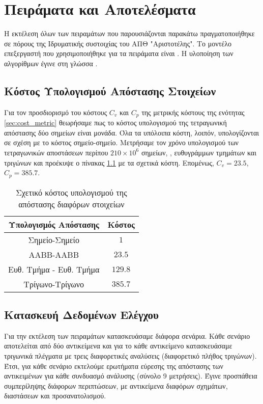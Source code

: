 \chapter{Πειράματα και Αποτελέσματα}
\label{ch:experiments}
Η εκτέλεση όλων των πειραμάτων που παρουσιάζονται παρακάτω 
πραγματοποιήθηκε σε πόρους της Ιδρυματικής συστοιχίας του 
ΑΠΘ "Αριστοτέλης".
Το μοντέλο επεξεργαστή που χρησιμοποιήθηκε για τα πειράματα 
είναι .
Η υλοποίηση των αλγορίθμων έγινε στη γλώσσα . 


\section{Κόστος Υπολογισμού Απόστασης Στοιχείων}
\label{sec:geom_tests_cost}
Για τον προσδιορισμό του κόστους $C_v$ και $C_p$
της μετρικής κόστους της ενότητας \ref{sec:cost_metric}
θεωρήσαμε πως το κόστος υπολογισμού της τετραγωνική απόστασης
δύο σημείων είναι μονάδα.
Όλα τα υπόλοιπα κόστη, λοιπόν, υπολογίζονται σε σχέση με το 
κόστος σημείο-σημείο. 
Μετρήσαμε τον χρόνο υπολογισμού των τετραγωνικών αποστάσεων 
περίπου $210\times10^6$ σημείων, , ευθυγράμμων τμημάτων 
και τριγώνων και προέκυψε ο πίνακας \ref{tab:distance_rel_cost} 
με τα σχετικά κόστη. Επομένως, $C_v=23.5$, $C_p=385.7$.

\begin{table}[h]
    \centering
    \begin{tabular}{|c|c|}
        \hline 
        Υπολογισμός Απόστασης & Κόστος \\
        \hline
        Σημείο-Σημείο & $1$ \\
        \hline 
        AABB-AABB & $23.5$ \\
        \hline
        Ευθ. Τμήμα - Ευθ. Τμήμα & $129.8$ \\
        \hline
        Τρίγωνο-Τρίγωνο & $385.7$ \\
        \hline
    \end{tabular}
    \caption[]{Σχετικό κόστος υπολογισμού της απόστασης διαφόρων στοιχείων}
    \label{tab:distance_rel_cost}
\end{table}

\section{Κατασκευή Δεδομένων Ελέγχου}
Για την εκτέλεση των πειραμάτων κατασκευάσαμε διάφορα σενάρια.
Κάθε σενάριο αποτελείται από δύο αντικείμενα και για το κάθε 
αντικείμενο κατασκευάσαμε τριγωνικά πλέγματα με τρεις διαφορετικές 
αναλύσεις (διαφορετικό πλήθος τριγώνων).
Έτσι, για κάθε σενάριο εκτελούμε ερωτήματα εύρεσης της απόστασης 
των αντικειμένων για κάθε συνδυασμό ανάλυσης (σύνολο 9 μετρήσεις).
Έγινε προσπάθεια συμπερίληψης διάφορων περιπτώσεων, με αντικείμενα 
διαφόρων σχημάτων, διαστάσεων και προσανατολισμού.


